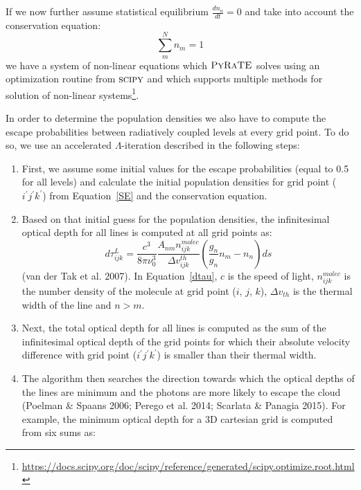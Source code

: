 \documentclass{mn2e}
\begin{document}
If we now further assume statistical equilibrium $\frac{dn_u}{dt}=0$ and take into account the conservation equation:
\begin{equation*}
\sum_m^N n_m = 1
\end{equation*}
we have a system of non-linear equations which $\textsc{PyRaTE}$ solves using an optimization routine from $\textsc{scipy}$ and which supports multiple methods for solution of non-linear systems\footnote{\url{https://docs.scipy.org/doc/scipy/reference/generated/scipy.optimize.root.html}}.

In order to determine the population densities we also have to compute the escape probabilities between radiatively coupled levels at every grid point. To do so, we use an accelerated $\Lambda$-iteration described in the following steps: 
\begin{enumerate}
\item{First, we assume some initial values for the escape probabilities (equal to 0.5 for all levels) and calculate the initial population densities for grid point ($i^\prime j^\prime k^\prime$) from Equation~\ref{SE}} and the conservation equation.\\ 
\item{Based on that initial guess for the population densities, the infinitesimal optical depth for all lines is computed at all grid points as:
\begin{equation}\label{dtau}
d\tau_{ijk}^L=\frac{c^3}{8\pi \nu_{0}^3}\frac{A_{nm}n_{ijk}^{molec}}{\Delta v_{ijk}^{th}}(\frac{g_n}{g_n}n_m-n_n)ds
\end{equation}
(van der Tak et al. 2007). In Equation~\ref{dtau}, $c$ is the speed of light, $n_{ijk}^{molec}$ is the number density of the molecule at grid point ($i$, $j$, $k$), $\Delta v_{th}$ is the thermal width of the line and $n>m$.}\\
\item{Next, the total optical depth for all lines is computed as the sum of the infinitesimal optical depth of the grid points for which their absolute velocity difference with grid point ($i^\prime j^\prime k^\prime$) is smaller than their thermal width.}\\
\item{The algorithm then searches the direction towards which the optical depths of the lines are minimum and the photons are more likely to escape the cloud (Poelman \& Spaans 2006; Perego et al. 2014; Scarlata \& Panagia 2015). For example, the minimum optical depth for a 3D cartesian grid is computed from six sums as:
}
\end{enumerate}
\end{document}
